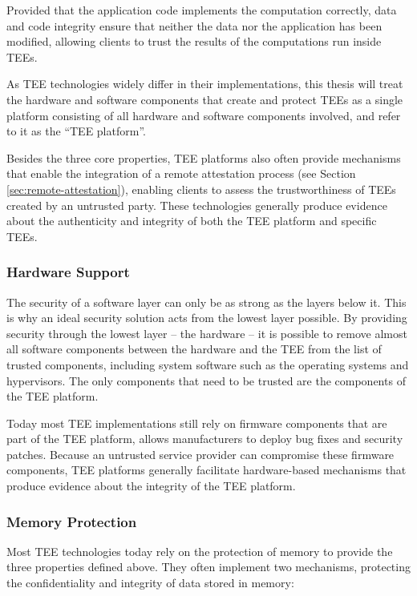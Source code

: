 Provided that the application code implements the computation correctly, data
and code integrity ensure that neither the data nor the application has been
modified, allowing clients to trust the results of the computations run inside
TEEs.

As TEE technologies widely differ in their implementations, this thesis will
treat the hardware and software components that create and protect TEEs as a
single platform consisting of all hardware and software components involved, and
refer to it as the ``TEE platform''.

Besides the three core properties, TEE platforms also often provide mechanisms
that enable the integration of a remote attestation process (see Section
\ref{sec:remote-attestation}), enabling clients to assess the trustworthiness of
TEEs created by an untrusted party. These technologies generally produce
evidence about the authenticity and integrity of both the TEE platform and
specific TEEs.

\subsubsection{Hardware Support}

The security of a software layer can only be as strong as the layers below it.
This is why an ideal security solution acts from the lowest layer possible. By
providing security through the lowest layer -- the hardware -- it is possible to
remove almost all software components between the hardware and the TEE from the
list of trusted components, including system software such as the operating
systems and hypervisors. The only components that need to be trusted are the
components of the TEE platform.

Today most TEE implementations still rely on firmware components that are part
of the TEE platform, allows manufacturers to deploy bug fixes and security
patches. Because an untrusted service provider can compromise these firmware
components, TEE platforms generally facilitate hardware-based mechanisms that
produce evidence about the integrity of the TEE platform.

\subsubsection{Memory Protection}

Most TEE technologies today rely on the protection of memory to provide the
three properties defined above. They often implement two mechanisms, protecting
the confidentiality and integrity of data stored in memory:

